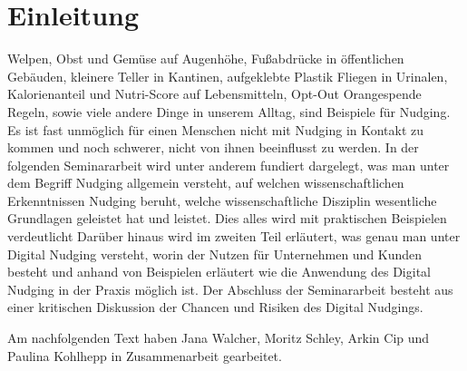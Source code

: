 \chapter{Einleitung}
Welpen, Obst und Gemüse auf Augenhöhe, Fußabdrücke in öffentlichen Gebäuden, kleinere Teller in Kantinen, aufgeklebte Plastik Fliegen in Urinalen, Kalorienanteil und Nutri-Score auf Lebensmitteln, Opt-Out Orangespende Regeln, sowie viele andere Dinge in unserem Alltag, sind Beispiele für Nudging. Es ist fast unmöglich für einen Menschen nicht mit Nudging in Kontakt zu kommen und noch schwerer, nicht von ihnen beeinflusst zu werden. In der folgenden Seminararbeit wird unter anderem fundiert dargelegt, was man unter dem Begriff Nudging allgemein versteht, auf welchen wissenschaftlichen Erkenntnissen Nudging beruht, welche wissenschaftliche Disziplin wesentliche Grundlagen geleistet hat und leistet. Dies alles wird mit praktischen Beispielen verdeutlicht Darüber hinaus wird im zweiten Teil erläutert, was genau man unter Digital Nudging versteht, worin der Nutzen für Unternehmen und Kunden besteht und anhand von Beispielen erläutert wie die Anwendung des Digital Nudging in der Praxis möglich ist. Der Abschluss der Seminararbeit besteht aus einer kritischen Diskussion der Chancen und Risiken des Digital Nudgings.

Am nachfolgenden Text haben Jana Walcher, Moritz Schley, Arkin Cip und Paulina Kohlhepp in Zusammenarbeit gearbeitet.